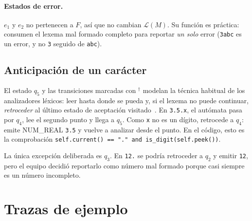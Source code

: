 \documentclass[11pt, a4paper]{article}
\theoremstyle{plain}
\theoremstyle{definition}
\newcommand{\lex}[1]{\texttt{#1}}             %
\newcommand{\Lang}{\mathcal{L}}
\begin{document}
\paragraph{Estados de error.} $e_1$ y $e_2$ no pertenecen a $F$, así que no cambian
$\Lang(M)$. Su función es práctica: consumen el lexema mal formado completo para
reportar \emph{un solo} error (\lex{3abc} es un error, y no \lex{3} seguido de
\lex{abc}).

\subsection{Anticipación de un carácter}
\label{sec:anticipacion}

El estado $q_5$ y las transiciones marcadas con $^{\dagger}$ modelan la técnica habitual
de los analizadores léxicos: leer hasta donde se pueda y, si el lexema no puede
continuar, \emph{retroceder} al último estado de aceptación visitado~\cite{dragon}. En
\lex{3.5.x}, el autómata pasa por $q_4$, lee el segundo punto y llega a $q_5$. Como
\lex{x} no es un dígito, retrocede a $q_4$: emite \textsf{NUM\_REAL} \lex{3.5} y vuelve a
analizar desde el punto. En el código, esto es la comprobación
\verb|self.current() == "." and is_digit(self.peek())|.

La única excepción deliberada es $q_3$. En \lex{12.} se podría retroceder a $q_2$ y emitir
\lex{12}, pero el equipo decidió reportarlo como número mal formado porque casi siempre
es un número incompleto.

\section{Trazas de ejemplo}
\end{document}
